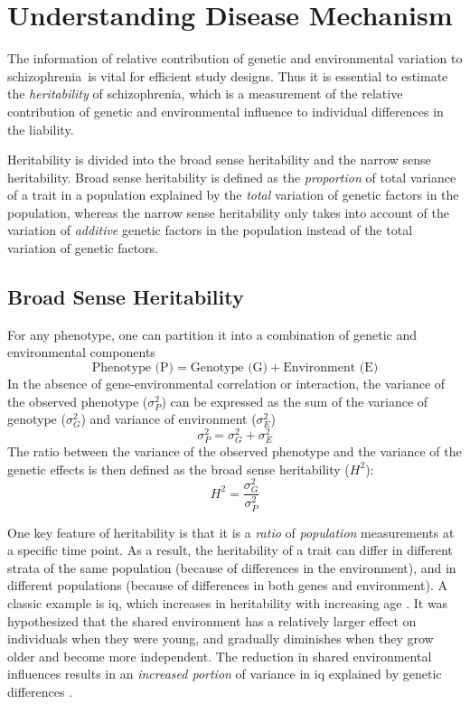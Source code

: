 \documentclass[12pt]{scrbook}
\newcommand*{\scz}{schizophrenia}
\begin{document}
\section{Understanding Disease Mechanism}
The information of relative contribution of genetic and environmental variation to \scz\ is vital for efficient study designs.
Thus it is essential to estimate the \emph{heritability} of \scz, which is a measurement of the relative contribution of genetic and environmental influence to individual differences in the liability.

Heritability is divided into the broad sense heritability and the narrow sense heritability.
Broad sense heritability is defined as the \emph{proportion} of total variance of a trait in a population explained by the \emph{total} variation of genetic factors in the population, whereas the narrow sense heritability only takes into account of the variation of \emph{additive} genetic factors in the population instead of the total variation of genetic factors.

\subsection{Broad Sense Heritability}
For any phenotype, one can partition it into a combination of genetic and environmental components \citep{Falconer1996}
$$
\text{Phenotype (P)}=\text{Genotype (G)}+\text{Environment (E)}
$$
In the absence of gene-environmental correlation or interaction, the variance of the observed phenotype ($\sigma_P^2$) can be expressed as the sum of the variance of genotype ($\sigma_G^2$) and variance of environment ($\sigma_E^2$)
$$
\sigma_P^2=\sigma_G^2+\sigma_E^2
$$
The ratio between the variance of the observed phenotype and the variance of the genetic effects is then defined as the broad sense heritability ($H^2$):
$$
H^2=\frac{\sigma_G^2}{\sigma_P^2}
$$

One key feature of heritability is that it is a \emph{ratio} of \emph{population} measurements at a specific time point.
As a result, the heritability of a trait can differ in different strata of the same population (because of differences in the environment), and in different populations (because of differences in both genes and environment).
A classic example is \gls{iq}, which increases in heritability with increasing age \citep{Bouchard2013}.
It was hypothesized that the shared environment has a relatively larger effect on individuals when they were young, and gradually diminishes when they grow older and become more independent.
The reduction in shared environmental influences results in an \emph{increased portion} of variance in \gls{iq} explained by genetic differences \citep{Bouchard2013}. 
\end{document}

